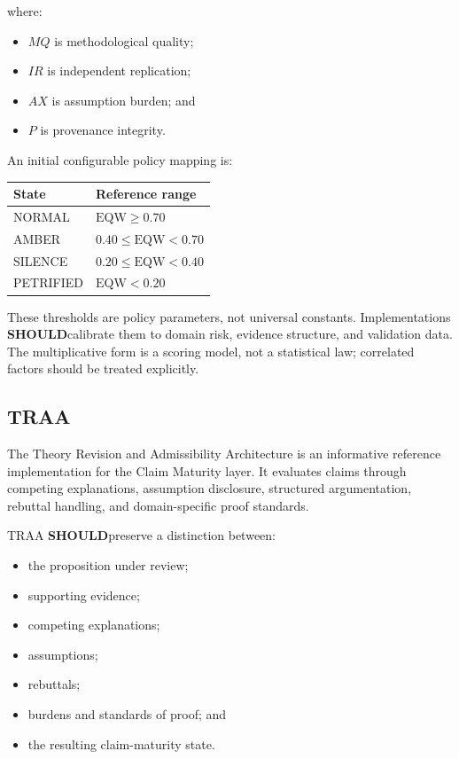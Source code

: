 \documentclass[11pt,a4paper]{article}
\newcommand{\should}{\textbf{SHOULD}}
\begin{document}
where:

\begin{itemize}[leftmargin=*]
  \item $MQ$ is methodological quality;
  \item $IR$ is independent replication;
  \item $AX$ is assumption burden; and
  \item $P$ is provenance integrity.
\end{itemize}

An initial configurable policy mapping is:

\begin{center}
\begin{tabular}{ll}
\toprule
\textbf{State} & \textbf{Reference range} \\
\midrule
NORMAL & $\mathrm{EQW} \geq 0.70$ \\
AMBER & $0.40 \leq \mathrm{EQW} < 0.70$ \\
SILENCE & $0.20 \leq \mathrm{EQW} < 0.40$ \\
PETRIFIED & $\mathrm{EQW} < 0.20$ \\
\bottomrule
\end{tabular}
\end{center}

These thresholds are policy parameters, not universal constants. Implementations \should calibrate them to domain risk, evidence structure, and validation data. The multiplicative form is a scoring model, not a statistical law; correlated factors should be treated explicitly.

\subsection{TRAA}

The Theory Revision and Admissibility Architecture is an informative reference implementation for the Claim Maturity layer. It evaluates claims through competing explanations, assumption disclosure, structured argumentation, rebuttal handling, and domain-specific proof standards.

TRAA \should preserve a distinction between:

\begin{itemize}[leftmargin=*]
  \item the proposition under review;
  \item supporting evidence;
  \item competing explanations;
  \item assumptions;
  \item rebuttals;
  \item burdens and standards of proof; and
  \item the resulting claim-maturity state.
\end{itemize}
\end{document}
